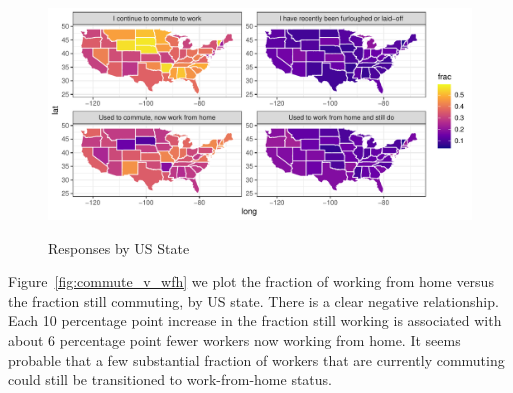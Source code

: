 \documentclass[12pt]{article}
\begin{document}
\begin{figure}
  \caption{Responses by US State} \label{fig:geo}
\centering
\begin{minipage}{1.0 \linewidth}
  \includegraphics[width = \linewidth]{plots/geo.pdf} \\
  \begin{footnotesize}
    \end{footnotesize}
\end{minipage}
\end{figure} 

Figure~\ref{fig:commute_v_wfh} we plot the fraction of working from home versus the fraction still commuting, by US state.
There is a clear negative relationship.
Each 10 percentage point increase in the fraction still working is associated with about 6 percentage point fewer workers now working from home.
It seems probable that a few substantial fraction of workers that are currently commuting could still be transitioned to work-from-home status. 
\end{document}
